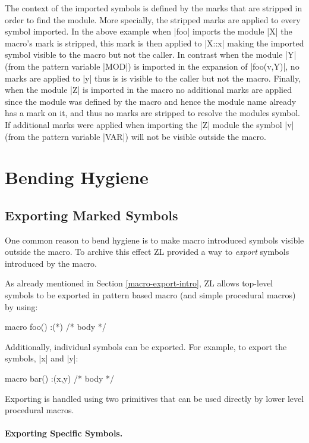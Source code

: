 The context of the imported symbols is defined by the marks that are
stripped in order to find the module.  More specially, the stripped
marks are applied to every symbol imported.  In the above example when
|foo| imports the module |X| the macro's mark is stripped, this mark
is then applied to |X::x| making the imported symbol visible to the
macro but not the caller.  In contrast when the module |Y| (from the
pattern variable |MOD|) is imported in the expansion of |foo(v,Y)|,
no marks are applied to |y| thus is is visible to the caller but not
the macro.  Finally, when the module |Z| is imported in the macro no
additional marks are applied since the module was defined by the macro
and hence the module name already has a mark on it, and thus no marks
are stripped to resolve the modules symbol.  If additional marks were
applied when importing the |Z| module the symbol |v| (from the
pattern variable |VAR|) will not be visible outside the macro.

\section{Bending Hygiene}
\label{bending-hygiene}

\subsection{Exporting Marked Symbols}
\label{macro-export}

One common reason to bend hygiene is to make macro introduced symbols
visible outside the macro.  To archive this effect ZL provided a way to
\textit{export} symbols introduced by the macro.

As already mentioned in Section \ref{macro-export-intro}, 
ZL allows top-level symbols to be exported in pattern based
macro (and simple procedural macros) by using:
\begin{code}
macro foo() :(*) {/* body */}
\end{code}
Additionally, individual symbols can be exported.  For example, to
export the symbols, |x| and |y|:
\begin{code}
macro bar() :(x,y) {/* body */}
\end{code}

Exporting is handled using two primitives that can be used
directly by lower level procedural macros.

\paragraph{Exporting Specific Symbols.}

